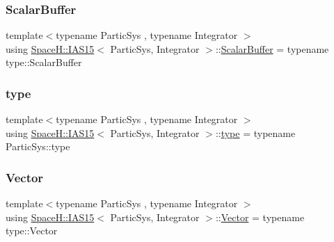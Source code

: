 \subsubsection{\texorpdfstring{Scalar\+Buffer}{ScalarBuffer}}
{\footnotesize\ttfamily template$<$typename Partic\+Sys , typename Integrator $>$ \\
using \mbox{\hyperlink{class_space_h_1_1_i_a_s15}{Space\+H\+::\+I\+A\+S15}}$<$ Partic\+Sys, Integrator $>$\+::\mbox{\hyperlink{class_space_h_1_1_i_a_s15_a17ef1472c0db7e9fdafffed41e5b9a3b}{Scalar\+Buffer}} =  typename type\+::\+Scalar\+Buffer}

\mbox{\label{class_space_h_1_1_i_a_s15_aaa8ebb8060b4421b9bb799dfb0a0d21a}} 
\subsubsection{\texorpdfstring{type}{type}}
{\footnotesize\ttfamily template$<$typename Partic\+Sys , typename Integrator $>$ \\
using \mbox{\hyperlink{class_space_h_1_1_i_a_s15}{Space\+H\+::\+I\+A\+S15}}$<$ Partic\+Sys, Integrator $>$\+::\mbox{\hyperlink{class_space_h_1_1_i_a_s15_aaa8ebb8060b4421b9bb799dfb0a0d21a}{type}} =  typename Partic\+Sys\+::type}

\mbox{\label{class_space_h_1_1_i_a_s15_ae34d12477ecdc0742911fc95748e5fd8}} 
\subsubsection{\texorpdfstring{Vector}{Vector}}
{\footnotesize\ttfamily template$<$typename Partic\+Sys , typename Integrator $>$ \\
using \mbox{\hyperlink{class_space_h_1_1_i_a_s15}{Space\+H\+::\+I\+A\+S15}}$<$ Partic\+Sys, Integrator $>$\+::\mbox{\hyperlink{class_space_h_1_1_i_a_s15_ae34d12477ecdc0742911fc95748e5fd8}{Vector}} =  typename type\+::\+Vector}

\mbox{\label{class_space_h_1_1_i_a_s15_a70aa5a3879ee4da4472dbeca219f9b3f}} 
